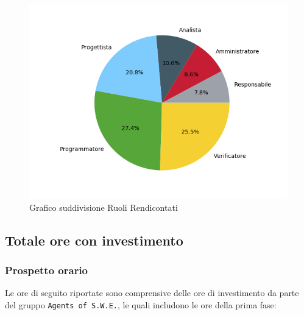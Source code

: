 \begin{figure}[H]
	\centering
  		\includegraphics[width=1\linewidth]{./images/torta_to.png}
  		\caption{Grafico suddivisione Ruoli Rendicontati}
  		\label{fig:grafico suddivione ruoli}
\end{figure}



\subsection{Totale ore con investimento}
\label{PTI}
\subsubsection{Prospetto orario}

Le ore di seguito riportate sono comprensive delle ore di investimento da parte del gruppo \texttt{Agents of S.W.E.}, le quali includono le ore della prima fase:


